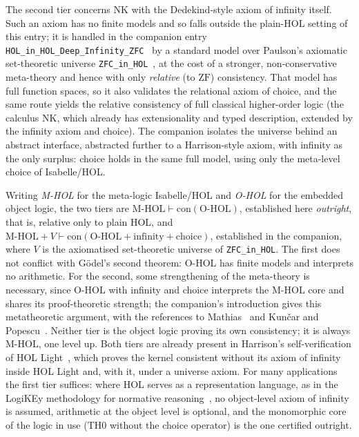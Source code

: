 \documentclass[11pt,a4paper]{article}
\begin{document}
The second tier concerns $\mathrm{NK}$ with the Dedekind-style axiom of
infinity itself.  Such an axiom has no finite models and so falls outside the plain-HOL setting of
this entry; it is handled in the companion entry
\texttt{HOL\_in\_HOL\_Deep\_Infinity\_ZFC}~\cite{InfinityZFC} by a
standard model over Paulson's axiomatic set-theoretic universe
\texttt{ZFC\_in\_HOL}~\cite{ZFCinHOL}, at the cost of a stronger,
non-conservative meta-theory and hence with only \emph{relative} (to
$\mathrm{ZF}$) consistency.  That model has full function spaces, so it
also validates the relational axiom of choice, and the same route yields
the relative consistency of full classical higher-order logic (the
calculus $\mathrm{NK}$, which already has extensionality and typed
description, extended by the infinity axiom and choice).  The companion
isolates the universe behind an abstract interface, abstracted further
to a Harrison-style axiom, with infinity as the only surplus: choice
holds in the same full model, using only the meta-level choice of
Isabelle/HOL.

Writing \emph{M-HOL} for the meta-logic Isabelle/HOL and \emph{O-HOL}
for the embedded object logic, the two tiers are
$\text{M-HOL}\vdash\mathrm{con}(\text{O-HOL})$, established here
\emph{outright}, that is, relative only to plain HOL, and
$\text{M-HOL}+V\vdash\mathrm{con}(\text{O-HOL}+\text{infinity}+\text{choice})$,
established in the companion, where $V$ is the axiomatised set-theoretic
universe of \texttt{ZFC\_in\_HOL}.  The first does not conflict with
G\"odel's second theorem: O-HOL has finite models and interprets no
arithmetic.  For the second, some strengthening of the meta-theory is
necessary, since O-HOL with infinity and choice interprets the M-HOL
core and shares its proof-theoretic strength; the companion's
introduction gives this metatheoretic argument, with the references to
Mathias~\cite{Mathias01} and Kun\v{c}ar and Popescu~\cite{KuncarPopescu19}.
Neither tier is the object logic proving its own consistency; it is
always M-HOL, one level up.  Both tiers are already present in
Harrison's self-verification of HOL Light~\cite{Harrison06}, which proves
the kernel consistent without its axiom of infinity inside HOL Light
and, with it, under a universe axiom.  For many applications the first tier
suffices: where HOL serves as a representation language, as in the
LogiKEy methodology for normative reasoning~\cite{LogiKEy}, no
object-level axiom of infinity is assumed, arithmetic at the object
level is optional, and the monomorphic core of the logic in use (TH0
without the choice operator) is the one certified outright.
\end{document}
